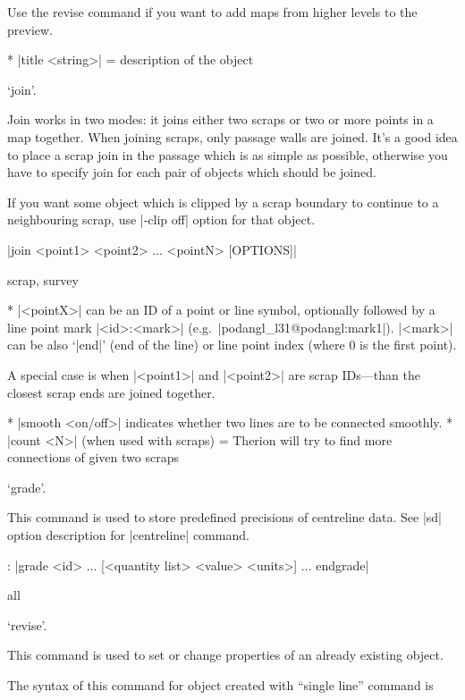    Use the revise command if you want to add maps from higher levels to the
    preview.
\endcomopt

\options
  * |title <string>| = description of the object
\endoptions


\subsubchapter `join'.

\description
  Join works in two modes: it joins either two scraps or two or more points 
  in a map together. When joining scraps, only passage walls are joined.
  It's a good idea to place a scrap join in the passage which is as simple 
  as possible, otherwise you have to specify join for each pair of objects 
  which should be joined. 
  
  If you want some object which is clipped by a scrap boundary to continue
  to a neighbouring scrap, use |-clip off| option for that object.
\enddescription

\syntax
  |join <point1> <point2> ... <pointN> [OPTIONS]|
\endsyntax

\context
  scrap, survey
\endcontext

\arguments
   * |<pointX>| can be an ID of a point or line symbol,
     optionally followed by a line point mark |<id>:<mark>| 
     (e.g.~|podangl_l31@podangl:mark1|).
     |<mark>| can be also `|end|' (end of the line) or line point index
     (where 0 is the first point). 
     
     A special case is when |<point1>| and |<point2>| are scrap 
     IDs---than the closest scrap ends are joined together.
\endarguments

\options
  * |smooth <on/off>| indicates whether two lines are to be connected 
    smoothly.
  * |count <N>| (when used with scraps) = Therion will try to find more 
    connections of given two scraps  
\endoptions


\subsubchapter `grade'.

\description
   This command is used to store predefined precisions of centreline data.
   See |sd| option description for |centreline| command. 
\enddescription

\syntax:
  |grade <id>
        ...
        [<quantity list> <value> <units>]
        ...
        endgrade|
\endsyntax

\context
  all
\endcontext


\subsubchapter `revise'.

\description
  This command is used to set or change properties of an already 
  existing object.
\enddescription

\syntax
  The syntax of this command for 
  object created with ``single line'' command is
  
